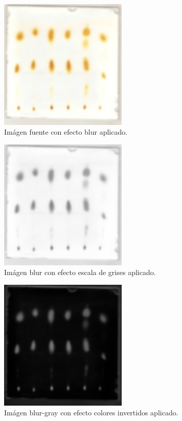 \begin{figure}[H]
	\vspace{-0.2cm}
	\centering
	\includegraphics[width=230px]{imagenes-jtlc/experimento/search-cut-points/1-blur}
	\centering
	\vspace{-0.4cm}
	\caption{Im\'agen fuente con efecto blur aplicado.}
	\label{fig:font-blur}
	\vspace{-0.15cm}
\end{figure}
\begin{figure}[H]
	  \vspace{-0.2cm}
	  \centering
	  \includegraphics[width=230px]{imagenes-jtlc/experimento/search-cut-points/2-gray}
	  \centering
	  \vspace{-0.4cm}
	  \caption{Im\'agen blur con efecto escala de grises aplicado.}
	  \label{fig:font-gray}
	  \vspace{-0.15cm}
\end{figure}
\begin{figure}[H]
	  \vspace{-0.2cm}
	  \centering
	  \includegraphics[width=230px]{imagenes-jtlc/experimento/search-cut-points/3-invert}
	  \centering
	  \vspace{-0.4cm}
	  \caption{Im\'agen blur-gray con efecto colores invertidos aplicado.}
	  \label{fig:font-invert}
	  \vspace{-0.15cm}
\end{figure}

